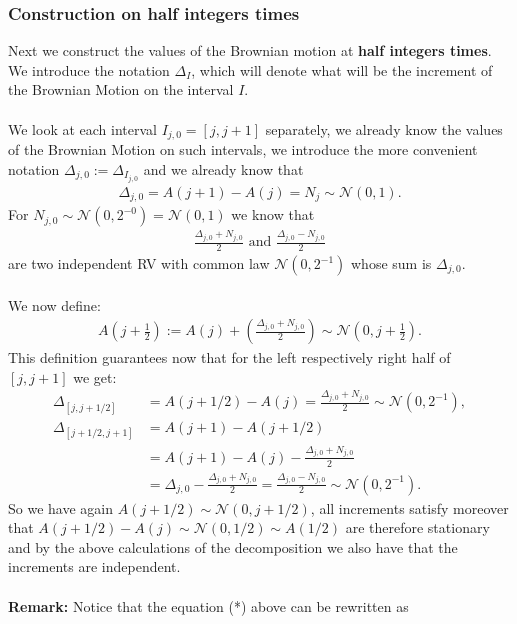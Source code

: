 \documentclass[../mainfile.tex]{subfiles}
\begin{document}
\subsubsection{Construction on half integers times}
Next we construct the values of the Brownian motion at \textbf{half integers times}. We introduce the notation $\Delta_I$, which will denote what will be the increment of the Brownian Motion on the interval $I$. 
\\\\
We look at each interval $I_{j,0}=[j,j+1]$ separately, we already know the values of the Brownian Motion on such intervals, we introduce the more convenient notation $\Delta_{j,0}:=\Delta_{I_{j,0}}$ and we already know that 
\begin{align*}
\Delta_{j,0}=A(j+1)-A(j)=N_j \sim \mathcal{N}(0,1).
\end{align*}
For $N_{j,0} \sim \mathcal{N}(0,2^{-0}) = \mathcal{N}(0,1)$ we know that 
\begin{align*}
\frac{\Delta_{j,0}+N_{j,0}}{2} \text{ and } \frac{\Delta_{j,0}-N_{j,0}}{2}
\end{align*}
are two independent RV with common law $\mathcal{N}(0,2^{-1})$ whose sum is $\Delta_{j,0}$. 
\\\\
We now define: 
\begin{align*}
A\left(j + \frac{1}{2}\right) := A(j) + \left( \frac{\Delta_{j,0}+N_{j,0}}{2} \right) \sim \mathcal{N}\left(0,j+ \frac{1}{2}\right). \tag{*}
\end{align*}
This definition guarantees now that for the left respectively right half of $[j,j+1]$ we get:
\begin{align*}
\Delta_{[j,j+1/2]} &= A(j+1/2)-A(j)= \frac{\Delta_{j,0}+N_{j,0}}{2} \sim \mathcal{N}(0,2^{-1}), \\
\Delta_{[j+1/2,j+1]} &= A(j+1)-A(j+1/2) \\
& = A(j+1)-A(j)-\frac{\Delta_{j,0}+N_{j,0}}{2} \\
& = \Delta_{j,0}-\frac{\Delta_{j,0}+N_{j,0}}{2}  = \frac{\Delta_{j,0}-N_{j,0}}{2} \sim \mathcal{N}(0,2^{-1}).
\end{align*}
So we have again $A(j+1/2) \sim \mathcal{N}(0, j+1/2)$, all increments satisfy moreover that $A(j+1/2)-A(j) \sim \mathcal{N}(0,1/2) \sim A(1/2)$ are therefore stationary and by the above calculations of the decomposition we also have that the increments are independent. 
\\\\
\textbf{Remark:} Notice that the equation (*) above can be rewritten as 
\end{document}
